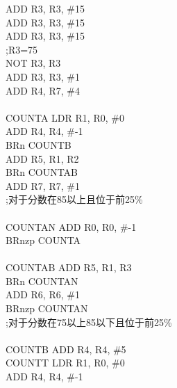 \documentclass[12pt]{ctexart}
\begin{document}
\hspace*{1.5cm}ADD R3, R3, \#15\\
\hspace*{1.5cm}ADD R3, R3, \#15\\
\hspace*{1.5cm}ADD R3, R3, \#15\\
\hspace*{1.5cm};R3=75\\
\hspace*{1.5cm}NOT R3, R3\\
\hspace*{1.5cm}ADD R3, R3, \#1\\
\hspace*{1.5cm}ADD R4, R7, \#4\\
\\
COUNTA  LDR R1, R0, \#0\\
\hspace*{1.5cm}ADD R4, R4, \#-1\\
\hspace*{1.5cm}BRn COUNTB\\
\hspace*{1.5cm}ADD R5, R1, R2\\
\hspace*{1.5cm}BRn COUNTAB\\
\hspace*{1.5cm}ADD R7, R7, \#1\\
\hspace*{1.5cm};对于分数在85以上且位于前25\%\\
\\
COUNTAN ADD R0, R0, \#-1\\
\hspace*{1.5cm}BRnzp COUNTA\\
\\
COUNTAB ADD R5, R1, R3\\
\hspace*{1.5cm}BRn COUNTAN\\
\hspace*{1.5cm}ADD R6, R6, \#1\\
\hspace*{1.5cm}BRnzp COUNTAN\\
\hspace*{1.5cm};对于分数在75以上85以下且位于前25\%\\
\\
COUNTB  ADD R4, R4, \#5\\
COUNTT  LDR R1, R0, \#0\\
\hspace*{1.5cm}ADD R4, R4, \#-1\\
\end{document}
